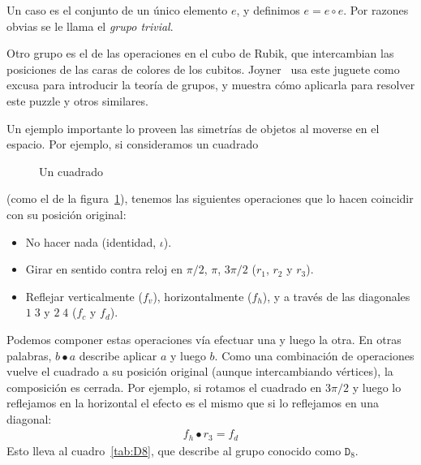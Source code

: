   Un caso es el conjunto de un único elemento \(e\),
  y definimos \(e = e \circ e\).
  Por razones obvias se le llama el \emph{grupo trivial}.%

  Otro grupo es el de las operaciones en el cubo de Rubik,%
  que intercambian las posiciones de las caras de colores de los cubitos.
  Joyner~\cite{joyner08:_adven_group_theory}
  usa este juguete como excusa para introducir la teoría de grupos,
  y muestra cómo aplicarla para resolver este puzzle
  y otros similares.

  Un ejemplo importante lo proveen
  las simetrías de objetos al moverse en el espacio.%
  Por ejemplo,
  si consideramos un cuadrado
  \begin{figure}[htbp]
    \centering
    \caption{Un cuadrado}
    \label{fig:simetria-cuadrado}
  \end{figure}
  (como el de la figura~\ref{fig:simetria-cuadrado}),
  tenemos las siguientes operaciones
  que lo hacen coincidir con su posición original:
  \begin{itemize}
  \item
    No hacer nada
    (identidad, \(\iota\)).
  \item
    Girar en sentido contra reloj en
    \(\pi / 2\), \(\pi\), \(3 \pi / 2\)
    (\(r_1\), \(r_2\) y	 \(r_3\)).
  \item
    Reflejar verticalmente
    (\(f_v\)),
    horizontalmente (\(f_h\)),
    y a través de las diagonales \(1\;3\) y \(2\;4\)
    (\(f_c\) y \(f_d\)).
  \end{itemize}
  Podemos componer estas operaciones vía efectuar una y luego la otra.%
  En otras palabras,
  \(b \bullet a\) describe aplicar \(a\) y luego \(b\).
  Como una combinación de operaciones
  vuelve el cuadrado a su posición original
  (aunque intercambiando vértices),
  la composición es cerrada.
  Por ejemplo,
  si rotamos el cuadrado en \(3 \pi / 2\)
  y luego lo reflejamos en la horizontal
  el efecto es el mismo que si lo reflejamos en una diagonal:
  \begin{align*}
    f_h \bullet r_3 = f_d
  \end{align*}
  Esto lleva al cuadro~\ref{tab:D8},
  que describe al grupo conocido como \(\mathtt{D}_8\).
